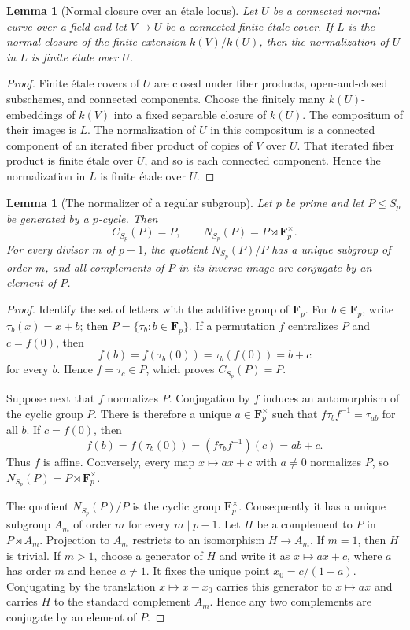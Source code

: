 \documentclass[11pt]{amsart}
\theoremstyle{plain}
\newtheorem{lemma}[theorem]{Lemma}
\theoremstyle{definition}
\numberwithin{equation}{section}
\begin{document}
\begin{lemma}[Normal closure over an \'etale locus]
\label{lem:normal-closure-etale}
Let $U$ be a connected normal curve over a field and let $V\to U$ be a
connected finite \'etale cover.  If $L$ is the normal closure of the finite
extension $k(V)/k(U)$, then the normalization of $U$ in $L$ is finite
\'etale over $U$.
\end{lemma}

\begin{proof}
Finite \'etale covers of $U$ are closed under fiber products, open-and-closed
subschemes, and connected components.  Choose the finitely many
$k(U)$-embeddings of $k(V)$ into a fixed separable closure of $k(U)$.  The
compositum of their images is $L$.  The normalization of $U$ in this
compositum is a connected component of an iterated fiber product of copies
of $V$ over $U$.  That iterated fiber product is finite \'etale over $U$, and
so is each connected component.  Hence the normalization in $L$ is finite
\'etale over $U$.
\end{proof}

\begin{lemma}[The normalizer of a regular subgroup]\label{lem:normalizer}
Let $p$ be prime and let $P\leq S_p$ be generated by a $p$-cycle.  Then
\[
 C_{S_p}(P)=P,\qquad
 N_{S_p}(P)=P\rtimes\mathbf F_p^\times.
\]
For every divisor $m$ of $p-1$, the quotient
$N_{S_p}(P)/P$ has a unique subgroup of order $m$, and all complements of
$P$ in its inverse image are conjugate by an element of $P$.
\end{lemma}

\begin{proof}
Identify the set of letters with the additive group of $\mathbf F_p$.  For
$b\in\mathbf F_p$, write $\tau_b(x)=x+b$; then
$P=\{\tau_b:b\in\mathbf F_p\}$.  If a permutation $f$ centralizes $P$ and
$c=f(0)$, then
\[
 f(b)=f(\tau_b(0))=\tau_b(f(0))=b+c
\]
for every $b$.  Hence $f=\tau_c\in P$, which proves $C_{S_p}(P)=P$.

Suppose next that $f$ normalizes $P$.  Conjugation by $f$ induces an
automorphism of the cyclic group $P$.  There is therefore a unique
$a\in\mathbf F_p^\times$ such that
$f\tau_bf^{-1}=\tau_{ab}$ for all $b$.  If $c=f(0)$, then
\[
 f(b)=f(\tau_b(0))=(f\tau_bf^{-1})(c)=ab+c.
\]
Thus $f$ is affine.  Conversely, every map $x\mapsto ax+c$ with
$a\ne0$ normalizes $P$, so
$N_{S_p}(P)=P\rtimes\mathbf F_p^\times$.

The quotient $N_{S_p}(P)/P$ is the cyclic group $\mathbf F_p^\times$.
Consequently it has a unique subgroup $A_m$ of order $m$ for every
$m\mid p-1$.  Let $H$ be a complement to $P$ in $P\rtimes A_m$.  Projection
to $A_m$ restricts to an isomorphism $H\to A_m$.  If $m=1$, then $H$ is
trivial.  If $m>1$, choose a generator of $H$ and write it as
$x\mapsto ax+c$, where $a$ has order $m$ and hence $a\ne1$.  It fixes the
unique point $x_0=c/(1-a)$.  Conjugating by the translation
$x\mapsto x-x_0$ carries this generator to $x\mapsto ax$ and carries $H$ to
the standard complement $A_m$.  Hence any two complements are conjugate by
an element of $P$.
\end{proof}
\end{document}
